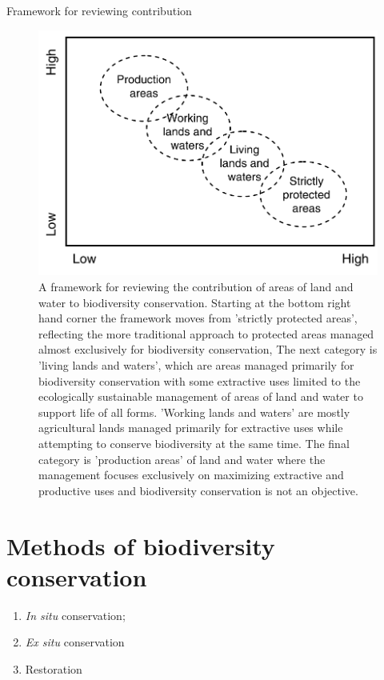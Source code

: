 \documentclass[
  ignorenonframetext,
  aspectratio=169]{beamer}
\providecommand{\tightlist}{%
  \setlength{\itemsep}{0pt}\setlength{\parskip}{0pt}}
\begin{document}
\begin{frame}{Framework for reviewing contribution}
\protect\hypertarget{framework-for-reviewing-contribution}{}
\begin{figure}
\includegraphics[width=0.45\linewidth]{./../images/contribution_review} \caption{A framework for reviewing the contribution of areas of land and water to biodiversity conservation. Starting at the bottom right hand corner the framework moves from 'strictly protected areas', reflecting the more traditional approach to protected areas managed almost exclusively for biodiversity conservation, The next category is 'living lands and waters', which are areas managed primarily for biodiversity conservation with some extractive uses limited to the ecologically sustainable management of areas of land and water to support life of all forms. 'Working lands and waters' are mostly agricultural lands managed primarily for extractive uses while attempting to conserve biodiversity at the same time. The final category is 'production areas' of land and water where the management focuses exclusively on maximizing extractive and productive uses and biodiversity conservation is not an objective.}\label{fig:contribution-review}
\end{figure}
\end{frame}

\hypertarget{methods-of-biodiversity-conservation}{%
\section{Methods of biodiversity
conservation}\label{methods-of-biodiversity-conservation}}

\begin{frame}{}
\protect\hypertarget{section-14}{}
\begin{enumerate}
\tightlist
\item
  \emph{In situ} conservation;
\item
  \emph{Ex situ} conservation
\item
  Restoration
\end{enumerate}
\end{frame}
\end{document}
